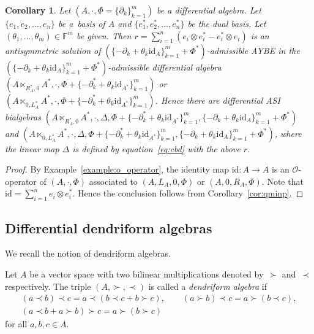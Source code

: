 \documentclass[10pt,a4paper]{amsart}
\numberwithin{equation}{section}
\newtheorem{Corollary}[Theorem]{Corollary}
\newcommand{\id}{\mathrm{id}}
\begin{document}
\begin{Corollary}\label{cor:idoop}
 Let $(A, \cdot, \Phi = \{\partial_k\}_{k=1}^m)$ be a differential algebra. Let $\{e_1, e_2, \dots, e_n\}$ be a~basis of $A$ and $\{e_1^*,e_2^*, \dots, e_n^*\}$ be the dual basis.
 Let $(\theta_1, \dots, \theta_m) \in \mathbb{F}^m$ be given.
 Then $r = \sum_{i=1}^n (e_i \otimes e_i^* - e_i^* \otimes e_i)$ is an antisymmetric solution of
 $(\{-\partial_k + \theta_k \id_A\}_{k=1}^m + \Phi^*)$-admissible AYBE in the
 $(\{-\partial_k + \theta_k \id_A\}_{k=1}^m +
 \Phi^*)$-admissible
 differential algebra $(A \ltimes_{R_A^*, 0}A^*, \cdot ,\Phi + \{-\partial_k^* + \theta_k \id_{A^*}\}_{k=1}^m)$ or $(A \ltimes_{0, L_A^*}A^*, \cdot ,\Phi + \{-\partial_k^* + \theta_k \id_{A^*}\}_{k=1}^m)$.
 Hence there are differential ASI bialgebras
 $(A \ltimes_{R_A^*, 0}A^*, \cdot, \Delta, \Phi + \{-\partial_k^* + \theta_k \id_{A^*}\}_{k=1}^m, \{-\partial_k + \theta_k \id_A\}_{k=1}^m + \Phi^*)$ and
 $(A \ltimes_{0, L_A^*}A^*, \cdot, \Delta, \Phi + \{-\partial_k^* + \theta_k \id_{A^*}\}_{k=1}^m, \{-\partial_k + \theta_k \id_A\}_{k=1}^m + \Phi^*)$,
 where the linear map $\Delta$ is defined by equation~\eqref{eq:cbd}
 with the above $r$.
\end{Corollary}
\begin{proof}
 By Example~\ref{example:o_operator},
 the identity map $\id\colon A \to A$ is an $\mathcal{O}$-operator of $(A, \cdot, \Phi)$ associated to $(A, L_A, 0,\Phi)$ or $(A, 0, R_A, \Phi)$.
 Note that $\id = \sum_{i=1}^n e_i \otimes e_i^*$.
 Hence the conclusion follows from Corollary~\ref{cor:qminp}.
\end{proof}

\subsection{Differential dendriform algebras}\label{subsec:dendriform}

We recall the notion of dendriform algebras.

\begin{Definition}
 Let $A$ be a vector space with two bilinear multiplications denoted by~$\succ$ and~$\prec$ respectively.
 The triple $(A, \succ, \prec)$ is called a \textit{dendriform algebra} if
 \begin{gather*}
 (a \prec b) \prec c = a \prec (b \prec c +b \succ c), \qquad
 (a \succ b) \prec c = a \succ (b \prec c), \\
 (a \prec b + a \succ b) \succ c = a \succ (b \succ c)
 \end{gather*}
	for all $a, b, c \in A$.
\end{Definition}
\end{document}
